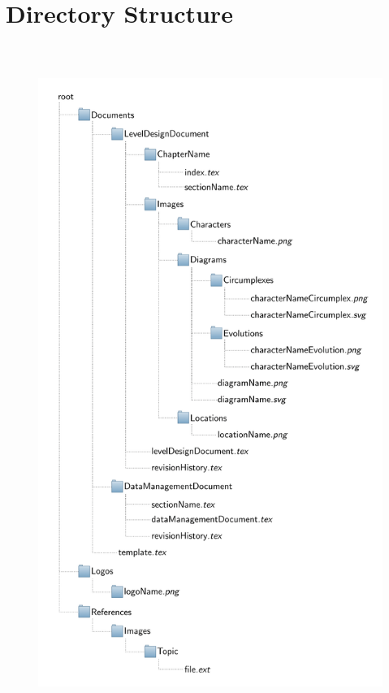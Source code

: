 \section{Directory Structure}
\begin{center}
  \begin{figure}[H]
  \centering
  \includegraphics[height=22cm]{directories}
  \end{figure}
\end{center}
